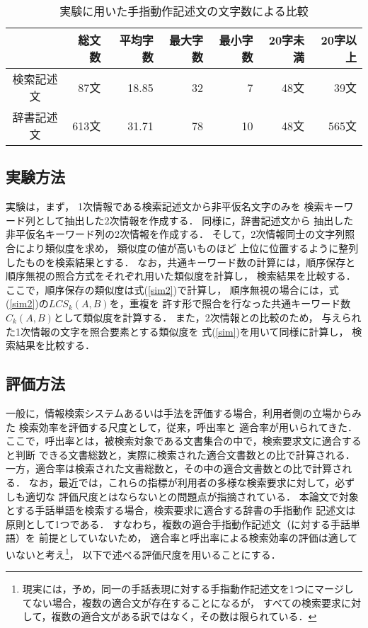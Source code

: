 \begin{table}[htbp]
\caption{実験に用いた手指動作記述文の文字数による比較}
\label{sample}
\begin{center}
\footnotesize\tabcolsep=3pt
\begin{tabular}{c|r|r|r|r|r|r} \hline
           &総文数 & 平均字数 & 最大字数 & 最小字数 & 20字未満 & 20字以上 \\
\hline\hline
検索記述文 &   87文&    18.85 &  32  &    7 &   48文     &  39文   \\ \hline
辞書記述文 &  613文&    31.71 &  78  &   10 &   48文     & 565文   \\ \hline
\end{tabular}
\end{center}
\end{table}


\subsection {実験方法}

実験は，まず，
1次情報である検索記述文から非平仮名文字のみを
検索キーワード列として抽出した2次情報を作成する．
同様に，辞書記述文から
抽出した非平仮名キーワード列の2次情報を作成する．
そして，2次情報同士の文字列照合により類似度を求め，
類似度の値が高いものほど
上位に位置するように整列したものを検索結果とする．
なお，共通キーワード数の計算には，順序保存と
順序無視の照合方式をそれぞれ用いた類似度を計算し，
検索結果を比較する．
ここで，順序保存の類似度は式(\ref{sim2})で計算し，
順序無視の場合には，式(\ref{sim2})の$LCS_k(A,B)$を，重複を
許す形で照合を行なった共通キーワード数$C_k(A,B)$として類似度を計算する．
また，2次情報との比較のため，
与えられた1次情報の文字を照合要素とする類似度を
式(\ref{sim})を用いて同様に計算し，
検索結果を比較する．

\subsection {評価方法}

一般に，情報検索システムあるいは手法を評価する場合，利用者側の立場からみた
検索効率を評価する尺度として，従来，呼出率と
適合率が用いられてきた．
ここで，呼出率とは，被検索対象である文書集合の中で，検索要求文に適合すると判断
できる文書総数と，実際に検索された適合文書数との比で計算される．
一方，適合率は検索された文書総数と，その中の適合文書数との比で計算される．
なお，最近では，これらの指標が利用者の多様な検索要求に対して，必ずしも適切な
評価尺度とはならないとの問題点が指摘されている\cite{Tokunaga1999}．
本論文で対象とする手話単語を検索する場合，検索要求に適合する辞書の手指動作
記述文は原則として1つである．
すなわち，複数の適合手指動作記述文（に対する手話単語）を
前提としていないため，
適合率と呼出率による検索効率の評価は適していないと考え\footnote{現実には，予め，同一の手話表現に対する手指動作記述文を1つにマージしてない場合，複数の適合文が存在することになるが，
すべての検索要求に対して，複数の適合文がある訳ではなく，その数は限られている．}，
以下で述べる評価尺度を用いることにする．

